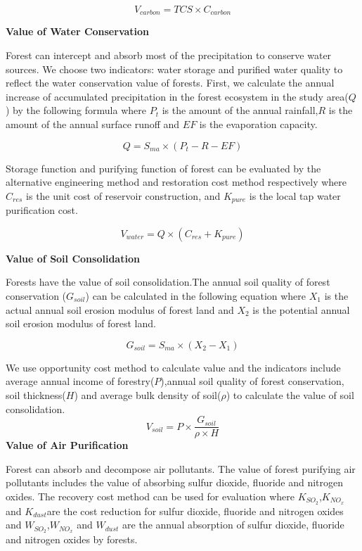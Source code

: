 \begin{equation}
V_{carbon} = TCS\times C_{carbon}
\end{equation}

\textbf{Value of Water Conservation}

Forest can intercept and absorb most of the precipitation to conserve water sources. We choose two indicators: water storage and purified water quality to reflect the water conservation value of forests.
First, we calculate the annual increase of accumulated precipitation in the forest ecosystem in the study area($Q$) by the following formula where $P_t$ is the amount of the annual rainfall,$R$ is the amount of the  annual surface runoff and $EF$ is the evaporation capacity.

\begin{equation}
Q = S_{ma}\times (P_{t}-R-EF)
\end{equation}

Storage function and purifying function of forest can be evaluated by the alternative engineering method and restoration cost method respectively where $C_{res}$ is the unit cost of reservoir construction, and $K_{pure}$ is the local tap water purification cost.

\begin{equation}
V_{water} = Q\times (C_{res} + K_{pure})
\end{equation}

\textbf{Value of Soil Consolidation}

Forests have the value of soil consolidation.The annual soil quality of forest conservation ($G_{soil}$) can be calculated in the following equation where $X_1$ is the actual annual soil erosion modulus of forest land and $X_2$ is the potential annual soil erosion modulus of forest land.

\begin{equation}
G_{soil} = S_{ma}\times (X_2 - X_1)
\end{equation}

We use opportunity cost method to calculate value and the indicators include average annual income of forestry($P$),annual soil quality of forest conservation, soil thickness($H$) and average bulk density of soil($\rho$) to calculate the value of soil consolidation.
\begin{equation}
V_{soil}=P \times \frac{G_{soil}}{\rho \times H}
\end{equation}
\newpage
\textbf{Value of Air Purification}

Forest can absorb and decompose air pollutants. The value of forest purifying air pollutants includes the value of absorbing sulfur dioxide, fluoride and nitrogen oxides. The recovery cost method can be used for evaluation where $K_{SO_{2}}$,$K_{NO_{x}}$ and $K_{dust}$are the cost reduction for sulfur dioxide, fluoride and nitrogen oxides and  $W_{SO_{2}}$,$W_{NO_{x}}$ and $W_{dust}$ are the annual absorption of sulfur dioxide, fluoride and nitrogen oxides by forests.

